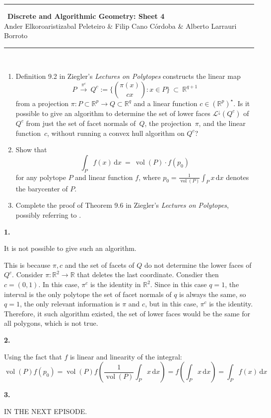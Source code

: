 \documentclass[10pt,a4paper]{article}
\DeclareMathOperator{\vol}{vol}
\newcommand{\RR}{\mathbb{R}}
\theoremstyle{plain}
\theoremstyle{remark}
\theoremstyle{definition}
\begin{document}
\thispagestyle{plain}
\begin{center}
\rule{\linewidth}{0.05mm}\
{\Large \textbf{Discrete and Algorithmic Geometry: Sheet 4\\}}
{\large Ander Elkoroaristizabal Peleteiro \& Filip Cano Córdoba \& Alberto Larrauri Borroto\\}
\rule{\linewidth}{0.05mm}\
\end{center}

\begin{enumerate}
	\item Definition 9.2 in Ziegler's \emph{Lectures on Polytopes} constructs the linear map
	\[
	P
	\ \xrightarrow{\pi^c}\ 
	Q^c :=
	\Big\{ \binom{\pi(x)}{cx} : x\in P\Big\}
	\ \subset \
	\RR^{q+1}
	\]
	from a projection $\pi:P\subset\RR^p\to Q\subset\RR^q$ and a linear function $c\in(\RR^p)^\star$.
	Is it possible to give an algorithm to determine the set of lower faces 
	$\mathcal L^\downarrow(Q^c)$ of $Q^c$ 
	from just the set of facet normals of~$Q$, 
	the projection~$\pi$, and the linear function~$c$, without running a convex hull algorithm on $Q^c$?
	
	\bigskip\bigskip
	\item Show that
	\[
	\int_P f(x)\,\text{d}x
	\ = \
	\vol(P) \cdot f(p_0)
	\]
	for any polytope $P$ and linear function $f$, 
	where $p_0 = \frac{1}{\vol(P)}\int_P x\,\text{d}x$ denotes the barycenter of $P$.
	\bigskip\bigskip
	\item Complete the proof of Theorem 9.6 in Ziegler's \emph{Lectures on Polytopes}, 
	possibly referring to \cite{bs-1992}.
	
\end{enumerate}


\textbf{1.}

It is not possible to give such an algorithm.

This is because $\pi,c$ and the set of facets of $Q$ do not determine the lower faces of $Q^c$.
Consider $\pi:\RR^2\to \RR$ that deletes the last coordinate. 
Consdier then $c=(0,1)$. 
In this case, $\pi^c$ is the identity in $\RR^2$.
Since in this case $q=1$, the interval is the only polytope the set of facet normals of $q$ is always the same,
so $q=1$, the only relevant information is $\pi$ and $c$, but in this case, $\pi^c$ is the identity.
Therefore, it such algorithm existed, the set of lower faces would be the same for all polygons,
which is not true.

\textbf{2.}

Using the fact that $f$ is linear and linearity of the integral:
\begin{equation}
	\vol(P) f(p_0)
	= \vol(P) f\left( \frac1{\vol (P)}\int_P x\,\mathrm{d}x \right)
	= f\left(\int_P x\,\mathrm{d}x \right) 
	= \int_P f(x) \,\mathrm{d}x
\end{equation}

\textbf{3. }

IN THE NEXT EPISODE.



\end{document}
